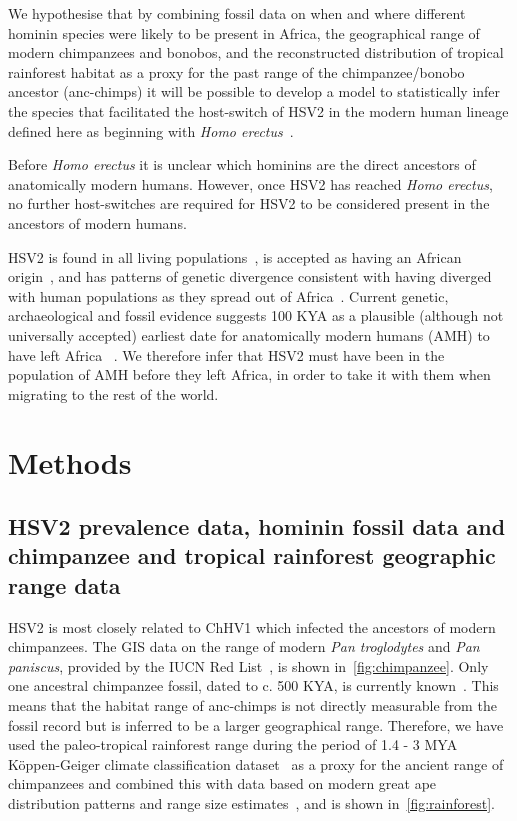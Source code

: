 \documentclass[fleqn,10pt]{wlscirep}
\begin{document}
We hypothesise that by combining fossil data on when and where different hominin species were likely to be present in Africa, the geographical range of modern chimpanzees and bonobos, and the reconstructed distribution of tropical rainforest habitat as a proxy for the past range of the chimpanzee/bonobo ancestor (anc-chimps) it will be possible to develop a model to statistically infer the species that facilitated the host-switch of HSV2 in the modern human lineage defined here as beginning with \textit{Homo erectus}~\citep{Anton2016}.

Before \textit{Homo erectus} it is unclear which hominins are the direct ancestors of anatomically modern humans. However, once HSV2 has reached \textit{Homo erectus}, no further host-switches are required for HSV2 to be considered present in the ancestors of modern humans.

HSV2 is found in all living populations~\citep{Looker2015}, is accepted as having an African origin~\citep{Koelle2017, Burrel2017}, and has patterns of genetic divergence consistent with having diverged with human populations as they spread out of Africa~\citep{Koelle2017}. Current genetic, archaeological and fossil evidence suggests 100 KYA as a plausible (although not universally accepted) earliest date for anatomically modern humans (AMH) to have left Africa ~\cite{MirazonLahr2016}. We therefore infer that HSV2 must have been in the population of AMH before they left Africa, in order to take it with them when migrating to the rest of the world.

\section*{Methods}
\subsection*{HSV2 prevalence data, hominin fossil data and chimpanzee and tropical rainforest geographic range data}

HSV2 is most closely related to ChHV1 which infected the ancestors of modern chimpanzees. The GIS data on the range of modern \textit{Pan troglodytes} and \textit{Pan paniscus},  provided by the IUCN Red List~\citep{Oates2008}, is shown in~\cref{fig:chimpanzee}.  Only one ancestral chimpanzee fossil, dated to c. 500 KYA, is currently known~\citep{Mcbrearty2005}. This means that the habitat range of anc-chimps is not directly measurable from the fossil record but is inferred to be a larger geographical range. Therefore, we have used the paleo-tropical rainforest range during the period of 1.4 - 3 MYA K\"{o}ppen-Geiger climate classification dataset~\cite{Peel2007} as a proxy for the ancient range of chimpanzees and combined this with data based on modern great ape distribution patterns and range size estimates~\citep{Thompson2003}, and is shown in~\cref{fig:rainforest}. 
\end{document}
